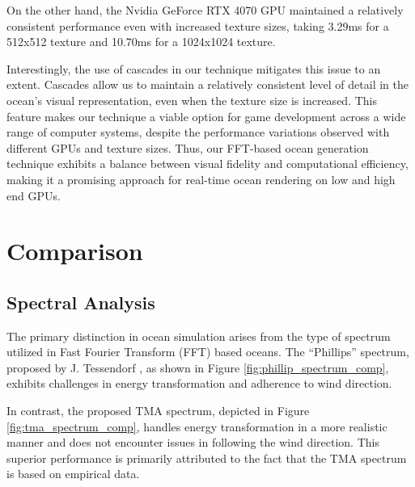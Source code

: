 On the other hand, the Nvidia GeForce RTX 4070 GPU maintained a relatively consistent performance even with increased texture sizes, taking 3.29ms for a 512x512 texture and 10.70ms for a 1024x1024 texture.

Interestingly, the use of cascades in our technique mitigates this issue to an extent. Cascades allow us to maintain a relatively consistent level of detail in the ocean’s visual representation, even when the texture size is increased. This feature makes our technique a viable option for game development across a wide range of computer systems, despite the performance variations observed with different GPUs and texture sizes. Thus, our FFT-based ocean generation technique exhibits a balance between visual fidelity and computational efficiency, making it a promising approach for real-time ocean rendering on low and high end GPUs.

\section{Comparison} 

\subsection{Spectral Analysis} 
The primary distinction in ocean simulation arises from the type of spectrum utilized in Fast Fourier Transform (FFT) based oceans. The “Phillips” spectrum, proposed by J. Tessendorf \cite{tessendorf2001}, as shown in Figure \ref{fig:phillip_spectrum_comp}, exhibits challenges in energy transformation and adherence to wind direction.

In contrast, the proposed TMA spectrum, depicted in Figure \ref{fig:tma_spectrum_comp}, handles energy transformation in a more realistic manner and does not encounter issues in following the wind direction. This superior performance is primarily attributed to the fact that the TMA spectrum is based on empirical data.

